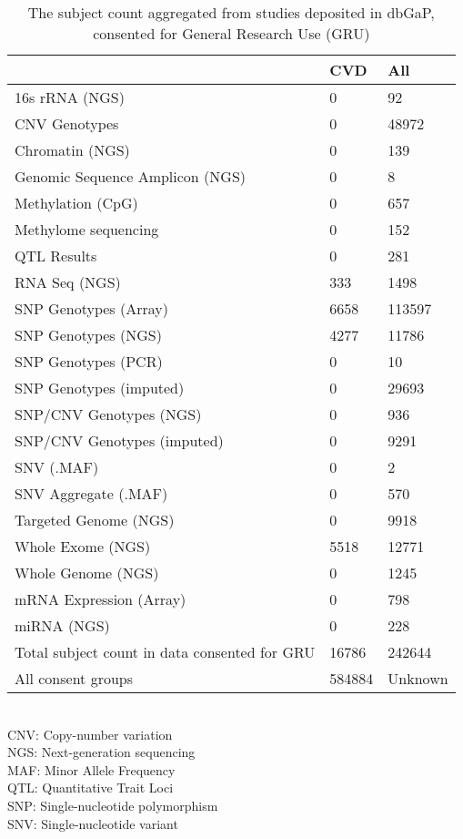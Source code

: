 \documentclass[11pt,letterpaper]{article}
\begin{document}
	\begin{table}[]
		\caption{The subject count aggregated from studies deposited in dbGaP, consented for General Research Use (GRU)
			\label{tab:dbgapSubject}}
		{\begin{tabular}{l l l}
				\hline
				& \textbf{CVD} &  \textbf{All}                         \\ \hline
				16s rRNA (NGS)                 &     0 &      92 \\
				CNV Genotypes                  &     0 &   48972 \\
				Chromatin (NGS)                &     0 &     139 \\
				Genomic Sequence Amplicon (NGS)&     0 &       8 \\
				Methylation (CpG)              &     0 &     657 \\
				Methylome sequencing           &     0 &     152 \\
				QTL Results                    &     0 &     281 \\
				RNA Seq (NGS)                  &   333 &    1498 \\
				SNP Genotypes (Array)          &  6658 &  113597 \\
				SNP Genotypes (NGS)            &  4277 &   11786 \\
				SNP Genotypes (PCR)            &     0 &      10 \\
				SNP Genotypes (imputed)        &     0 &   29693 \\
				SNP/CNV Genotypes (NGS)        &     0 &     936 \\
				SNP/CNV Genotypes (imputed)    &     0 &    9291 \\
				SNV (.MAF)                     &     0 &       2 \\
				SNV Aggregate (.MAF)           &     0 &     570 \\
				Targeted Genome (NGS)          &     0 &    9918 \\
				Whole Exome (NGS)              &  5518 &   12771 \\
				Whole Genome (NGS)             &     0 &    1245 \\
				mRNA Expression (Array)        &     0 &     798 \\
				miRNA (NGS)                        & 0 &   228 \\ \hline
				Total subject count in data consented for GRU & 16786 & 242644 \\ \hline
				All consent groups & 584884 & Unknown \\	\hline
		\end{tabular}}\\ \newline
	\footnotesize{CNV: Copy-number variation\\NGS: Next-generation sequencing\\MAF: Minor Allele Frequency\\ QTL: Quantitative Trait Loci\\SNP: Single-nucleotide polymorphism\\ SNV: Single-nucleotide variant}
	\end{table}
\end{document}
